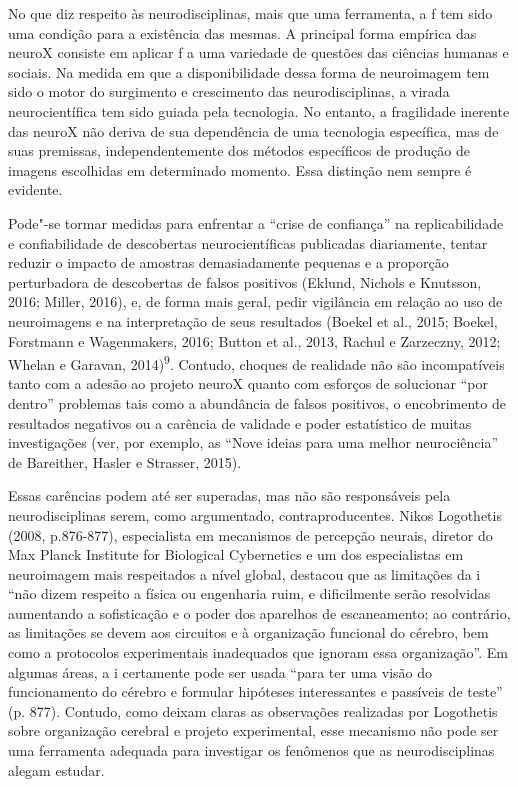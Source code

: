 No que diz respeito às neurodisciplinas, mais que uma ferramenta, a f
tem sido uma condição para a existência das mesmas. A principal forma
empírica das neuroX consiste em aplicar f a uma variedade de questões
das ciências humanas e sociais. Na medida em que a disponibilidade dessa
forma de neuroimagem tem sido o motor do surgimento e crescimento das
neurodisciplinas, a virada neurocientífica tem sido guiada pela
tecnologia. No entanto, a fragilidade inerente das neuroX não deriva de
sua dependência de uma tecnologia específica, mas de suas premissas,
independentemente dos métodos específicos de produção de imagens
escolhidas em determinado momento. Essa distinção nem sempre é evidente.

Pode"-se tormar medidas para enfrentar a ``crise de confiança'' na
replicabilidade e confiabilidade de descobertas neurocientíficas
publicadas diariamente, tentar reduzir o impacto de amostras
demasiadamente pequenas e a proporção perturbadora de descobertas de
falsos positivos (Eklund, Nichols e Knutsson, 2016; Miller, 2016), e, de
forma mais geral, pedir vigilância em relação ao uso de neuroimagens e
na interpretação de seus resultados (Boekel et al., 2015; Boekel,
Forstmann e Wagenmakers, 2016; Button et al., 2013, Rachul e Zarzeczny,
2012; Whelan e Garavan, 2014)\textsuperscript{9}. Contudo, choques de
realidade não são incompatíveis tanto com a adesão ao projeto neuroX
quanto com esforços de solucionar ``por dentro'' problemas tais como a
abundância de falsos positivos, o encobrimento de resultados negativos
ou a carência de validade e poder estatístico de muitas investigações
(ver, por exemplo, as ``Nove ideias para uma melhor neurociência'' de
Bareither, Hasler e Strasser, 2015).

Essas carências podem até ser superadas, mas não são responsáveis pela
neurodisciplinas serem, como argumentado, contraproducentes. Nikos
Logothetis (2008, p.876-877), especialista em mecanismos de percepção
neurais, diretor do Max Planck Institute for Biological Cybernetics e um
dos especialistas em neuroimagem mais respeitados a nível global,
destacou que as limitações da i ``não dizem respeito a física ou
engenharia ruim, e dificilmente serão resolvidas aumentando a
sofisticação e o poder dos aparelhos de escaneamento; ao contrário, as
limitações se devem aos circuitos e à organização funcional do cérebro,
bem como a protocolos experimentais inadequados que ignoram essa
organização''. Em algumas áreas, a i certamente pode ser usada ``para
ter uma visão do funcionamento do cérebro e formular hipóteses
interessantes e passíveis de teste'' (p. 877). Contudo, como deixam
claras as observações realizadas por Logothetis sobre organização
cerebral e projeto experimental, esse mecanismo não pode ser uma
ferramenta adequada para investigar os fenômenos que as neurodisciplinas
alegam estudar.


